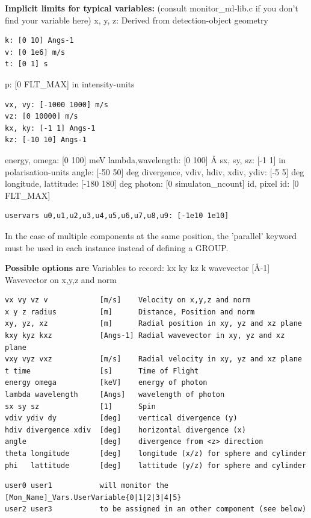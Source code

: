 \textbf{Implicit limits for typical variables:} (consult monitor\_nd-lib.c if you don't find your variable here) x, y, z: Derived from detection-object geometry

\begin{verbatim}
k: [0 10] Angs-1
v: [0 1e6] m/s
t: [0 1] s
\end{verbatim}

p: [0 FLT\_MAX] in intensity-units

\begin{verbatim}
vx, vy: [-1000 1000] m/s
vz: [0 10000] m/s
kx, ky: [-1 1] Angs-1
kz: [-10 10] Angs-1
\end{verbatim}

energy, omega: [0 100] meV lambda,wavelength: [0 100] \AA{} sx, sy, sz: [-1 1] in polarisation-units angle: [-50 50] deg divergence, vdiv, hdiv, xdiv, ydiv: [-5 5] deg longitude, lattitude: [-180 180] deg photon: [0 simulaton\_ncount] id, pixel id: [0 FLT\_MAX]

\begin{verbatim}
uservars u0,u1,u2,u3,u4,u5,u6,u7,u8,u9: [-1e10 1e10]
\end{verbatim}

In the case of multiple components at the same position, the 'parallel' keyword must be used in each instance instead of defining a GROUP.

\textbf{Possible options are} Variables to record: kx ky kz k wavevector [\AA{}-1] Wavevector on x,y,z and norm

\begin{verbatim}
vx vy vz v            [m/s]    Velocity on x,y,z and norm
x y z radius          [m]      Distance, Position and norm
xy, yz, xz            [m]      Radial position in xy, yz and xz plane
kxy kyz kxz           [Angs-1] Radial wavevector in xy, yz and xz plane
vxy vyz vxz           [m/s]    Radial velocity in xy, yz and xz plane
t time                [s]      Time of Flight
energy omega          [keV]    energy of photon
lambda wavelength     [Angs]   wavelength of photon
sx sy sz              [1]      Spin
vdiv ydiv dy          [deg]    vertical divergence (y)
hdiv divergence xdiv  [deg]    horizontal divergence (x)
angle                 [deg]    divergence from <z> direction
theta longitude       [deg]    longitude (x/z) for sphere and cylinder
phi   lattitude       [deg]    lattitude (y/z) for sphere and cylinder
\end{verbatim}

\begin{verbatim}
user0 user1           will monitor the [Mon_Name]_Vars.UserVariable{0|1|2|3|4|5}
user2 user3           to be assigned in an other component (see below)
\end{verbatim}

